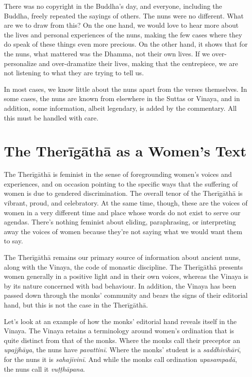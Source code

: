 \documentclass[12pt,openany]{book}%
\begin{document}
There was no copyright in the Buddha’s day, and everyone, including the Buddha, freely repeated the sayings of others. The nuns were no different. What are we to draw from this? On the one hand, we would love to hear more about the lives and personal experiences of the nuns, making the few cases where they do speak of these things even more precious. On the other hand, it shows that for the nuns, what mattered was the Dhamma, not their own lives. If we over-personalize and over-dramatize their lives, making that the centrepiece, we are not listening to what they are trying to tell us.

In most cases, we know little about the nuns apart from the verses themselves. In some cases, the nuns are known from elsewhere in the Suttas or Vinaya, and in addition, some information, albeit legendary, is added by the commentary. All this must be handled with care.

\section*{The \textsanskrit{Therīgāthā} as a Women’s Text}

The \textsanskrit{Therīgāthā} is feminist in the sense of foregrounding women’s voices and experiences, and on occasion pointing to the specific ways that the suffering of women is due to gendered discrimination. The overall tenor of the \textsanskrit{Therīgāthā} is vibrant, proud, and celebratory. At the same time, though, these are the voices of women in a very different time and place whose words do not exist to serve our agendas. There’s nothing feminist about eliding, paraphrasing, or interpreting away the voices of women because they’re not saying what we would want them to say.

The \textsanskrit{Therīgāthā} remains our primary source of information about ancient nuns, along with the Vinaya, the code of monastic discipline. The \textsanskrit{Therīgāthā} presents women generally in a positive light and in their own voices, whereas the Vinaya is by its nature concerned with bad behaviour. In addition, the Vinaya has been passed down through the monks’ community and bears the signs of their editorial hand, but this is not the case in the \textsanskrit{Therīgāthā}.

Let’s look at an example of how the monks’ editorial hand reveals itself in the Vinaya. The Vinaya retains a terminology around women’s ordination that is quite distinct from that of the monks. Where the monks call their preceptor an \textit{\textsanskrit{upajjhāya}}, the nuns have \textit{\textsanskrit{pavattinī}}. Where the monks’ student is a \textit{\textsanskrit{saddhivihārī}}, for the nuns it is \textit{\textsanskrit{sahajīvinī}}. And while the monks call ordination \textit{\textsanskrit{upasampadā}}, the nuns call it \textit{\textsanskrit{vuṭṭhāpana}}.
\end{document}
